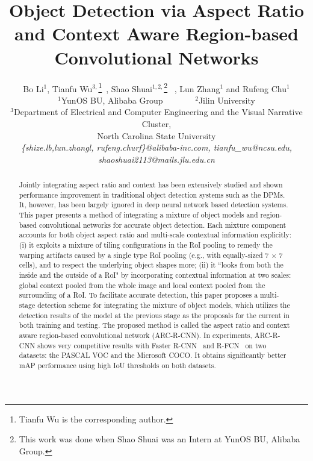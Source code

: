 \documentclass[10pt,twocolumn,letterpaper]{article}
\begin{document}
\title{Object Detection via Aspect Ratio and Context Aware Region-based Convolutional Networks}

\author{Bo Li$^{1}$, Tianfu Wu$^{3,}$\thanks{Tianfu Wu is the corresponding author.}\ , Shao Shuai$^{1,2,}$\thanks{This work was done when Shao Shuai was an Intern at YunOS BU, Alibaba Group.} \ , Lun Zhang$^{1}$ and Rufeng Chu$^{1}$ \\
$^{1}$YunOS BU, Alibaba Group \ \ \ \ \ \ \ $^{2}$Jilin University\\
$^{3}$Department of Electrical and Computer Engineering and the Visual Narrative Cluster, \\North Carolina State University  \\
\small{\it \{shize.lb,lun.zhangl, rufeng.churf\}@alibaba-inc.com, tianfu\_wu@ncsu.edu, shaoshuai2113@mails.jlu.edu.cn}
}

\maketitle

\begin{abstract}
\vspace{-5mm}
Jointly integrating aspect ratio and context has been extensively studied and shown performance improvement in traditional object detection systems such as the DPMs. It, however, has been largely ignored in deep neural network based detection systems. This paper presents a method of integrating a mixture of object models and region-based convolutional networks for accurate object detection.  Each mixture component accounts for both object aspect ratio and multi-scale contextual information explicitly:
(i) it exploits a mixture of tiling configurations in the RoI pooling to remedy the warping artifacts caused by a single type RoI pooling (e.g., with equally-sized 7 $\times$ 7 cells), and to respect the underlying object shapes more; (ii) it ``looks from both the inside and the outside of a RoI" by incorporating contextual information at two scales: global context pooled from the whole image  and local context pooled from the surrounding of a RoI. To facilitate accurate detection, this paper proposes a multi-stage detection scheme for integrating the mixture of object models, which utilizes the detection results of the model at the previous stage as the proposals for the current in both training and testing.
The proposed method is called the aspect ratio and context aware region-based convolutional network (ARC-R-CNN).   
In experiments, ARC-R-CNN shows very competitive results with Faster R-CNN~\cite{faster_rcnn} and R-FCN~\cite{rfcn} on two datasets: the PASCAL VOC and the Microsoft COCO. It obtains significantly better mAP performance using high IoU thresholds on both datasets.  
\end{abstract}
\end{document}
